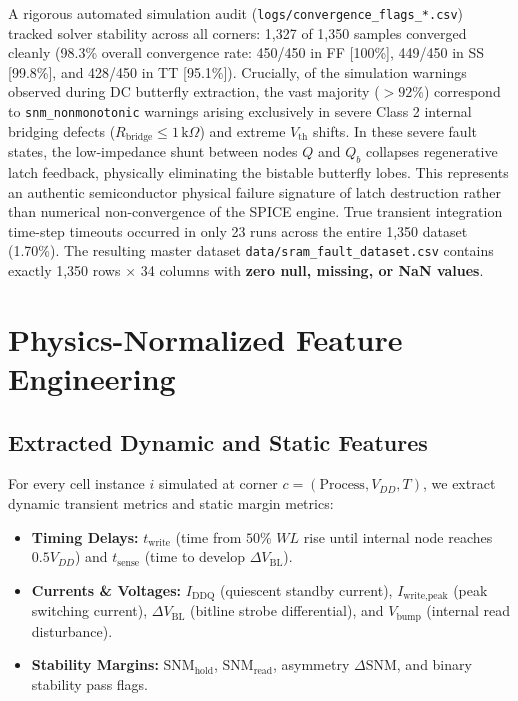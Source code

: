 \documentclass[conference]{IEEEtran}
\begin{document}
A rigorous automated simulation audit (\texttt{logs/convergence\_flags\_*.csv}) tracked solver stability across all corners: 1,327 of 1,350 samples converged cleanly (98.3\% overall convergence rate: 450/450 in FF [100\%], 449/450 in SS [99.8\%], and 428/450 in TT [95.1\%]). Crucially, of the simulation warnings observed during DC butterfly extraction, the vast majority ($>92\%$) correspond to \texttt{snm\_nonmonotonic} warnings arising exclusively in severe Class 2 internal bridging defects ($R_{\text{bridge}} \le 1\,\text{k}\Omega$) and extreme $V_{\text{th}}$ shifts. In these severe fault states, the low-impedance shunt between nodes $Q$ and $Q_b$ collapses regenerative latch feedback, physically eliminating the bistable butterfly lobes. This represents an authentic semiconductor physical failure signature of latch destruction rather than numerical non-convergence of the SPICE engine. True transient integration time-step timeouts occurred in only 23 runs across the entire 1,350 dataset (1.70\%). The resulting master dataset \texttt{data/sram\_fault\_dataset.csv} contains exactly 1,350 rows $\times$ 34 columns with \textbf{zero null, missing, or NaN values}.


\section{Physics-Normalized Feature Engineering}
\label{sec:features}

\subsection{Extracted Dynamic and Static Features}
For every cell instance $i$ simulated at corner $c = (\text{Process}, V_{DD}, T)$, we extract dynamic transient metrics and static margin metrics:
\begin{itemize}
    \item \textbf{Timing Delays:} $t_{\text{write}}$ (time from $50\%$ $WL$ rise until internal node reaches $0.5 V_{DD}$) and $t_{\text{sense}}$ (time to develop $\Delta V_{\text{BL}}$).
    \item \textbf{Currents \& Voltages:} $I_{\text{DDQ}}$ (quiescent standby current), $I_{\text{write,peak}}$ (peak switching current), $\Delta V_{\text{BL}}$ (bitline strobe differential), and $V_{\text{bump}}$ (internal read disturbance).
    \item \textbf{Stability Margins:} $\text{SNM}_{\text{hold}}$, $\text{SNM}_{\text{read}}$, asymmetry $\Delta \text{SNM}$, and binary stability pass flags.
\end{itemize}
\end{document}
